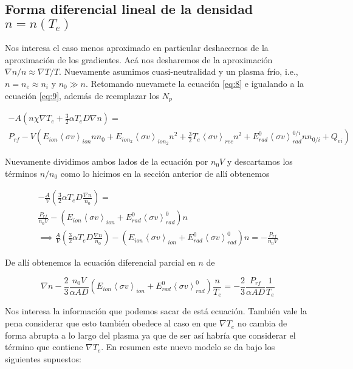 \subsection{Forma diferencial lineal de la densidad $n = n(T_e)$}
  Nos interesa el caso menos aproximado en particular deshacernos de la aproximaci\'on de los gradientes. Ac\'a nos desharemos de la aproximaci\'on $\nabla n /n \approx \nabla T /T$. Nuevamente asumimos cuasi-neutralidad y un plasma fr\'io, i.e., $n = n_e \approx n_i$ y $n_0 \gg n$. Retomando nuevamete la ecuaci\'on \eqref{eq:8} e igualando a la ecuaci\'on \eqref{eq:9}, adem\'as de reemplazar los $N_p$

  \begin{eqnarray*}
    -A\left(n\chi\nabla T_e + \frac{3}{2}\alpha T_e D\nabla n\right) = \\ P_{rf} - V\left(E_{ion}\left<\sigma v\right>_{ion}nn_0 + E_{ion_2}\left<\sigma v\right>_{ion_2}n^2 + \frac{3}{2}T_e\left<\sigma v\right>_{rec}n^2 + E_{rad}^0\left<\sigma v\right>_{rad}^{0/i}n n_{0/i} + Q_{ei}\right) 
  \end{eqnarray*}

  Nuevamente dividimos ambos lados de la ecuaci\'on por $n_0 V$ y descartamos los t\'erminos $n/n_0$ como lo hicimos en la secci\'on anterior de all\'i obtenemos

  \begin{eqnarray*}
    -\frac{A}{V}\left(\frac{3}{2}\alpha T_e D\frac{\nabla n}{n_0}\right) = \\ \frac{P_{rf}}{n_0V} - \left(E_{ion}\left<\sigma v\right>_{ion} + E_{rad}^0\left<\sigma v\right>_{rad}^{0}\right)n \\
    \implies \frac{A}{V}\left(\frac{3}{2}\alpha T_e D\frac{\nabla n}{n_0}\right) - \left(E_{ion}\left<\sigma v\right>_{ion} + E_{rad}^0\left<\sigma v\right>_{rad}^{0  }\right)n = -\frac{P_{rf}}{n_0V}
    \end{eqnarray*}
 
    De all\'i obtenemos la ecuaci\'on diferencial parcial en $n$ de 

    \begin{equation}
      \nabla n - \frac{2}{3}\frac{n_0 V}{\alpha AD}\left(  E_{ion}\left<\sigma v\right>_{ion} + E_{rad}^0\left<\sigma v\right>_{rad}^0\right)\frac{n}{T_e} = - \frac{2}{3}\frac{P_{rf}}{\alpha AD}\frac{1}{T_e}
    \end{equation}

  Nos interesa la informaci\'on que podemos sacar de est\'a ecuaci\'on. Tambi\'en vale la pena considerar que esto tambi\'en obedece al caso en que $\nabla T_e$ no cambia de forma abrupta a lo largo del plasma ya que de ser as\'i habr\'ia que considerar el t\'ermino que contiene $\nabla T_e$. En resumen este nuevo modelo se da bajo los siguientes supuestos:

